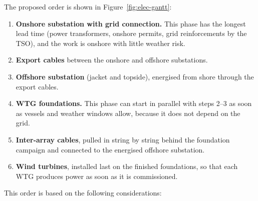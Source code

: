 The proposed order is shown in Figure~\ref{fig:elec-gantt}:

\begin{enumerate}
    \item \textbf{Onshore substation with grid connection.} This phase has the longest lead time (power transformers, onshore permits, grid reinforcements by the TSO), and the work is onshore with little weather risk.
    \item \textbf{Export cables} between the onshore and offshore substations.
    \item \textbf{Offshore substation} (jacket and topside), energised from shore through the export cables.
    \item \textbf{WTG foundations.} This phase can start in parallel with steps 2--3 as soon as vessels and weather windows allow, because it does not depend on the grid.
    \item \textbf{Inter-array cables}, pulled in string by string behind the foundation campaign and connected to the energised offshore substation.
    \item \textbf{Wind turbines}, installed last on the finished foundations, so that each WTG produces power as soon as it is commissioned.
\end{enumerate}

This order is based on the following considerations:

